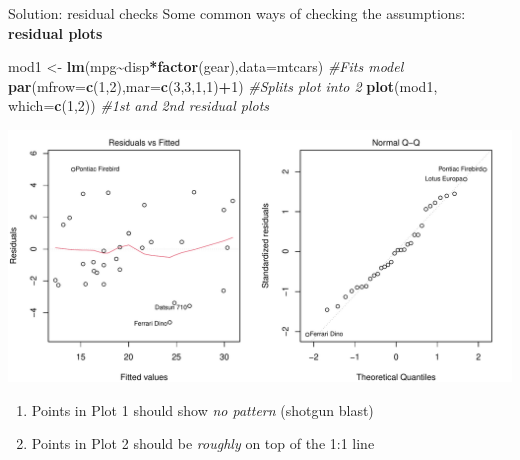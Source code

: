 \documentclass[
  ignorenonframetext,
  aspectratio=169]{beamer}
\newenvironment{Shaded}{\begin{snugshade}}{\end{snugshade}}
\newcommand{\AttributeTok}[1]{\textcolor[rgb]{0.13,0.29,0.53}{#1}}
\newcommand{\CommentTok}[1]{\textcolor[rgb]{0.56,0.35,0.01}{\textit{#1}}}
\newcommand{\DecValTok}[1]{\textcolor[rgb]{0.00,0.00,0.81}{#1}}
\newcommand{\FunctionTok}[1]{\textcolor[rgb]{0.13,0.29,0.53}{\textbf{#1}}}
\newcommand{\NormalTok}[1]{#1}
\newcommand{\OtherTok}[1]{\textcolor[rgb]{0.56,0.35,0.01}{#1}}
\newcommand{\SpecialCharTok}[1]{\textcolor[rgb]{0.81,0.36,0.00}{\textbf{#1}}}
\providecommand{\tightlist}{%
  \setlength{\itemsep}{0pt}\setlength{\parskip}{0pt}}
\let\oldShaded\Shaded %
\let\endoldShaded\endShaded
\renewenvironment{Shaded}{\scriptsize\oldShaded}{\endoldShaded}
\begin{document}
\begin{frame}[fragile]{Solution: residual checks}
\protect\hypertarget{solution-residual-checks}{}
Some common ways of checking the assumptions: \textbf{residual plots}

\tiny

\begin{Shaded}
\begin{Highlighting}[]
\NormalTok{mod1 }\OtherTok{\textless{}{-}} \FunctionTok{lm}\NormalTok{(mpg}\SpecialCharTok{\textasciitilde{}}\NormalTok{disp}\SpecialCharTok{*}\FunctionTok{factor}\NormalTok{(gear),}\AttributeTok{data=}\NormalTok{mtcars) }\CommentTok{\#Fits model}
\FunctionTok{par}\NormalTok{(}\AttributeTok{mfrow=}\FunctionTok{c}\NormalTok{(}\DecValTok{1}\NormalTok{,}\DecValTok{2}\NormalTok{),}\AttributeTok{mar=}\FunctionTok{c}\NormalTok{(}\DecValTok{3}\NormalTok{,}\DecValTok{3}\NormalTok{,}\DecValTok{1}\NormalTok{,}\DecValTok{1}\NormalTok{)}\SpecialCharTok{+}\DecValTok{1}\NormalTok{) }\CommentTok{\#Splits plot into 2}
\FunctionTok{plot}\NormalTok{(mod1, }\AttributeTok{which=}\FunctionTok{c}\NormalTok{(}\DecValTok{1}\NormalTok{,}\DecValTok{2}\NormalTok{)) }\CommentTok{\#1st and 2nd residual plots}
\end{Highlighting}
\end{Shaded}

\includegraphics[width=1\linewidth]{03-Lecture_files/figure-beamer/unnamed-chunk-26-1}

\normalsize

\begin{enumerate}[<+->]
\tightlist
\item
  Points in Plot 1 should show \emph{no pattern} (shotgun blast)
\item
  Points in Plot 2 should be \emph{roughly} on top of the 1:1 line
\end{enumerate}
\end{frame}
\end{document}
